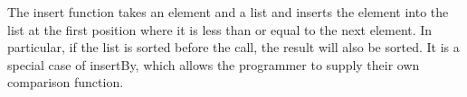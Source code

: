 The insert function takes an element and a list and inserts the element into the list at the first position where it is less than or equal to the next element. In particular, if the list is sorted before the call, the result will also be sorted. It is a special case of insertBy, which allows the programmer to supply their own comparison function.
